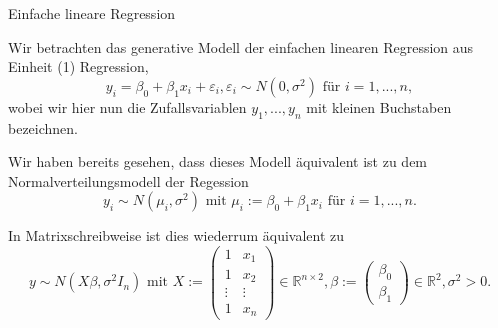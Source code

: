 \documentclass[
  8pt,
  ignorenonframetext,
]{beamer}
\begin{document}
\begin{frame}{Einfache lineare Regression}
\protect\hypertarget{einfache-lineare-regression}{}
\footnotesize

Wir betrachten das generative Modell der einfachen linearen Regression
aus Einheit (1) Regression, \begin{equation}\label{eq:slr}
y_i = \beta_0 + \beta_1x_i + \varepsilon_i, \varepsilon_i \sim N(0,\sigma^2) \mbox{ für } i = 1,...,n,
\end{equation} wobei wir hier nun die Zufallsvariablen \(y_1,...,y_n\)
mit kleinen Buchstaben bezeichnen. \vspace{3mm}

Wir haben bereits gesehen, dass dieses Modell äquivalent ist zu dem
Normalverteilungsmodell der Regession \begin{equation}
y_i \sim N(\mu_i,\sigma^2) \mbox{ mit } \mu_i := \beta_0 + \beta_1x_i \mbox{ für } i = 1,...,n.
\end{equation} \vspace{1mm}

In Matrixschreibweise ist dies wiederrum äquivalent zu \begin{equation}
y \sim N(X\beta,\sigma^2I_n) \mbox{ mit }
X :=
\begin{pmatrix}
1      & x_1        \\
1      & x_2        \\
\vdots & \vdots     \\
1      & x_n
\end{pmatrix}
\in \mathbb{R}^{n \times 2},
\beta :=
\begin{pmatrix}
\beta_0 \\
\beta_1
\end{pmatrix}
\in \mathbb{R}^2,
\sigma^2 > 0.
\end{equation}
\end{frame}
\end{document}

